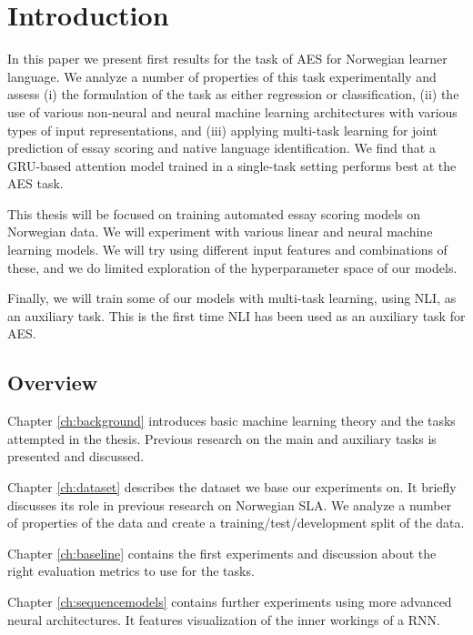 \chapter{Introduction}

\acresetall

In this paper we present first results for the task of \ac{AES} for Norwegian learner language. We analyze a number of properties of
this task experimentally and assess (i) the formulation of the task as either
regression or classification, (ii) the use of various non-neural and neural
machine learning architectures with various types of input representations,
and (iii) applying multi-task learning for joint prediction of essay scoring
and native language identification. We find that a GRU-based attention model
trained in a single-task setting performs best at the AES task.


This thesis will be focused on training automated essay scoring models on
Norwegian data. We will experiment with various linear and neural machine
learning models. We will try using different input features and combinations
of these, and we do limited exploration of the hyperparameter space of our
models.

Finally, we will train some of our models with multi-task learning, using
\ac{NLI}, as an auxiliary task. This is the first time \ac{NLI} has been used
as an auxiliary task for \ac{AES}.

\section{Overview}

Chapter \ref{ch:background} introduces basic machine learning theory and the
tasks attempted in the thesis. Previous research on the main and auxiliary
tasks is presented and discussed.

Chapter \ref{ch:dataset} describes the dataset we base our experiments on. It
briefly discusses its role in previous research on Norwegian \ac{SLA}. We
analyze a number of properties of the data and create a
training/test/development split of the data.

Chapter \ref{ch:baseline} contains the first experiments and discussion about
the right evaluation metrics to use for the tasks.

Chapter \ref{ch:sequencemodels} contains further experiments using more advanced
neural architectures. It features visualization of the inner workings of a
RNN.

